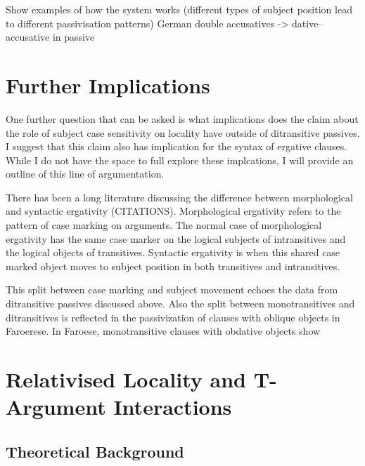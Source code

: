 Show examples of how the system works (different types of subject position lead to different passivisation patterns)
 German double accusatives -> dative--accusative in passive
	

\section{Further Implications}
One further question that can be asked is what implications does the claim about the role of subject case sensitivity on locality have outside of ditransitive passives. I suggest that this claim also has implication for the syntax of ergative clauses. While I do not have the space to full explore these implcations, I will provide an outline of this line of argumentation.

There has been a long literature discussing the difference between morphological and syntactic ergativity (CITATIONS). Morphological ergativity refers to the pattern of case marking on arguments. The normal case of morphological ergativity has the same case marker on the logical subjects of intransitives and the logical objects of transitives. Syntactic ergativity is when this shared case marked object moves to subject position in both transitives and intransitives.

This split between case marking and subject movement echoes the data from ditransitive passives discussed above. Also the split between monotransitives and ditransitives is reflected in the passivization of clauses with oblique objects in Faroerese. In Faroese, monotransitive clauses with obdative objects show 


\section{Relativised Locality and T-Argument Interactions}\label{sec:RelLoc}
\subsection{Theoretical Background}
